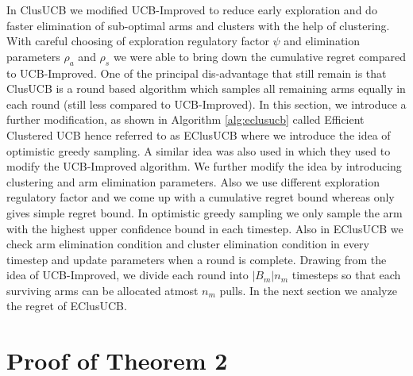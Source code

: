 In ClusUCB we modified UCB-Improved to reduce early exploration and do faster elimination of sub-optimal arms and clusters with the help of clustering. With careful choosing of exploration regulatory factor $\psi$ and elimination parameters $\rho_{a}$ and $\rho_{s}$ we were able to bring down the cumulative regret compared to UCB-Improved. One of the principal dis-advantage that still remain is that ClusUCB is a round based algorithm which samples all remaining arms equally in each round (still less compared to UCB-Improved). In this section, we introduce a further modification,  as shown in Algorithm \ref{alg:eclusucb} called Efficient Clustered UCB hence referred to as EClusUCB where we introduce the idea of optimistic greedy sampling. A similar idea was also used in \cite{liu2016modification} which they used to modify the UCB-Improved algorithm. We further modify the idea by introducing clustering and arm elimination parameters. Also we use different exploration regulatory factor and we come up with a cumulative regret bound whereas  \cite{liu2016modification} only gives simple regret bound. In optimistic greedy sampling we only sample the arm with the highest upper confidence bound in each timestep. Also in EClusUCB we check arm elimination condition and cluster elimination condition in every timestep and update parameters when a round is complete. Drawing from the idea of UCB-Improved, we divide each round into $|B_{m}|n_{m}$ timesteps so that each surviving arms can be allocated atmost $n_{m}$ pulls. In the next section we analyze the regret of EClusUCB. 


\section{Proof of Theorem 2}


